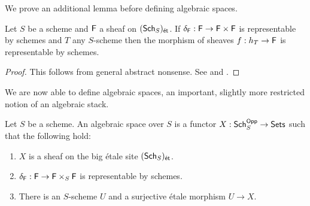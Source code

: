 We prove an additional lemma before defining algebraic spaces.
\begin{lemma}\label{lem: rep diagonal then rep}
    Let $S$ be a scheme and $\mathsf{F}$ a sheaf on $(\mathsf{Sch}_{S})_{\mathsf{\acute{e}t}}$. If $\delta_{\mathsf{F}}:\mathsf{F}\to\mathsf{F}\times\mathsf{F}$ is representable by schemes and $T$ any $S$-scheme then the morphism of sheaves $f:h_{T}\to\mathsf{F}$ is representable by schemes. 
\end{lemma} 
\begin{proof}
    This follows from general abstract nonsense. See \cite[\href{https://stacks.math.columbia.edu/tag/0022}{Lemma 0022}]{stacks-project} and \cite[\href{https://stacks.math.columbia.edu/tag/0024}{Lemma 0024}]{stacks-project}. 
\end{proof}
We are now able to define algebraic spaces, an important, slightly more restricted notion of an algebraic stack. 
\begin{definition}\label{def: algebraic space}
    Let $S$ be a scheme. An algebraic space over $S$ is a functor $X:\mathsf{Sch}_{S}^{\mathsf{Opp}}\to\mathsf{Sets}$ such that the following hold:
    \begin{enumerate}[label=(\alph*)]
        \item $X$ is a sheaf on the big \'{e}tale site $(\mathsf{Sch}_{S})_{\mathsf{\acute{e}t}}$. 
        \item $\delta_{\mathsf{F}}:\mathsf{F}\to\mathsf{F}\times_{S}\mathsf{F}$ is representable by schemes. 
        \item There is an $S$-scheme $U$ and a surjective \'{e}tale morphism $U\to X$. 
    \end{enumerate}
\end{definition}